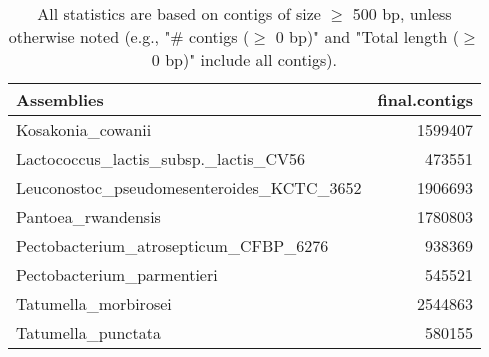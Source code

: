 \documentclass[12pt,a4paper]{article}
\begin{document}
\begin{table}[ht]
\begin{center}
\caption{All statistics are based on contigs of size $\geq$ 500 bp, unless otherwise noted (e.g., "\# contigs ($\geq$ 0 bp)" and "Total length ($\geq$ 0 bp)" include all contigs).}
\begin{tabular}{|l*{1}{|r}|}
\hline
Assemblies & final.contigs \\ \hline
Kosakonia\_cowanii & 1599407 \\ \hline
Lactococcus\_lactis\_subsp.\_lactis\_CV56 & 473551 \\ \hline
Leuconostoc\_pseudomesenteroides\_KCTC\_3652 & 1906693 \\ \hline
Pantoea\_rwandensis & 1780803 \\ \hline
Pectobacterium\_atrosepticum\_CFBP\_6276 & 938369 \\ \hline
Pectobacterium\_parmentieri & 545521 \\ \hline
Tatumella\_morbirosei & 2544863 \\ \hline
Tatumella\_punctata & 580155 \\ \hline
\end{tabular}
\end{center}
\end{table}
\end{document}
